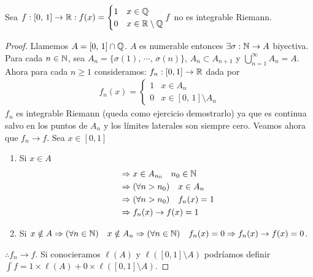 \begin{eg}
    Sea $f: [0 \text{, } 1] \to \mathbb{R} : f(x) = \begin{cases}
            1 & x \in \mathbb{Q}              \\
            0 & x \in \mathbb{R} \setminus \mathbb{Q}
        \end{cases} f$ no es integrable Riemann.
    \begin{proof}
        Llamemos $A = [0 \text{, } 1] \cap \mathbb{Q}$. $A$ es numerable entonces $\exists \sigma: \mathbb{N} \to A$ biyectiva. Para cada $n \in \mathbb{N}$, sea
        $A_n = \{ \sigma(1)\text{, } \cdots \text{, } \sigma(n) \}$, $A_n \subset A_{n+1}$ y $\bigcup_{n=1}^{\infty} A_n = A$.
        Ahora para cada $n \geq 1$ consideramos:
        $f_n: [0, 1] \to \mathbb{R}$ dada por
        \begin{align*}
            f_n(x) = \begin{cases}
                         1 & x \in A_n                          \\
                         0 & x \in [0\text{, } 1] \setminus A_n
                     \end{cases}
        \end{align*}
        $f_n$ es integrable Riemann (queda como ejercicio demostrarlo) ya que es continua salvo en los puntos de $A_n$ y
        los límites laterales son siempre cero.
        Veamos ahora que $f_n \to f$. Sea $x \in [0, 1]$ \begin{enumerate}
            \item Si $x \in A$ \begin{align*}
                       & \Rightarrow x \in A_{n_0} \quad n_0 \in \mathbb{N}          \\
                       & \Rightarrow (\forall n > n_0) \quad x \in A_n  \\
                       & \Rightarrow (\forall n > n_0) \quad f_n(x) = 1 \\
                       & \Rightarrow f_n(x) \to f(x) = 1
                  \end{align*}
            \item Si $x \notin A \Rightarrow (\forall n \in \mathbb{N}) \quad x \notin A_n \Rightarrow (\forall n \in \mathbb{N}) \quad f_n(x) = 0 \Rightarrow f_n(x) \to f(x) = 0$.
        \end{enumerate} $\therefore f_n \to f$.
        Si conocieramos $\ell(A)$ y $\ell([0, 1] \setminus A)$ podríamos definir $\int f = 1 \times \ell(A) + 0 \times \ell([0, 1] \setminus A)$.
    \end{proof}
\end{eg}

